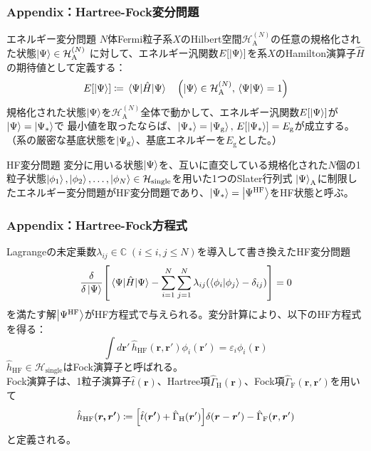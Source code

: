 \documentclass[14pt,aspectratio=169,xcolor=dvipsnames,table,dvipdfmx]{beamer}
\theoremstyle{definition}
\begin{document}
\begin{frame}
  \small
  \frametitle{Appendix：Hartree-Fock変分問題}
  \begin{block}{エネルギー変分問題}
    $N$体Fermi粒子系$X$のHilbert空間$\mathcal{H}_{\text{A}}^{(N)}$の任意の規格化された状態$\ket{\Psi}\in\mathcal{H}_{\text{A}}^{(N)}$
    に対して、エネルギー汎関数$E[\ket{\Psi}]$を系$X$のHamilton演算子$\hat{H}$の期待値として定義する：
    \begin{equation*}
      E[\ket{\Psi}]\coloneqq \ev{\hat{H}}{\Psi}\quad\qty(\ket{\Psi}\in\mathcal{H}_{\text{A}}^{(N)},\,\braket{\Psi}=1)
    \end{equation*}
    規格化された状態$\ket{\Psi}$を$\mathcal{H}_{\text{A}}^{(N)}$全体で動かして、エネルギー汎関数$E[\ket{\Psi}]$が$\ket{\Psi}=\ket{\Psi_*}$で
    最小値を取ったならば、$\ket{\Psi_*}=\ket{\Psi_{\text{g}}},\,E[\ket{\Psi_*}]=E_{\text{g}}$が成立する。\\
    （系の厳密な基底状態を$\ket{\Psi_{\text{g}}}$、基底エネルギーを$E_{\text{g}}$とした。）
  \end{block}
  \begin{exampleblock}{HF変分問題}
    変分に用いる状態$\ket{\Psi}$を、互いに直交している規格化された$N$個の1粒子状態$\ket{\phi_1},\ket{\phi_2},\ldots,\ket{\phi_{N}}\in\mathcal{H}_{\text{single}}$を用いた1つのSlater行列式
    $\ket{\Psi}_{\text{A}}$に制限したエネルギー変分問題がHF変分問題であり、$\ket{\Psi_*}=\ket{\Psi^{\text{HF}}}$をHF状態と呼ぶ。
  \end{exampleblock}
\end{frame}

\begin{frame}
  \frametitle{Appendix：Hartree-Fock方程式}
  \small
  Lagrangeの未定乗数$\lambda_{ij}\in\mathbb{C}\;(i\leq i,j\leq N)$を導入して書き換えたHF変分問題
  \begin{equation*}
    \fdv{\ket{\Psi}}\qty[\ev{\hat{H}}{\Psi}-\sum_{i=1}^N\sum_{j=1}^{N}\lambda_{ij}(\braket{\phi_i}{\phi_j}-\delta_{ij})]=0
  \end{equation*}
  を満たす解$\ket{\Psi^{\text{HF}}}$がHF方程式で与えられる。変分計算により、以下のHF方程式を得る：
  \begin{equation*}
    \int d\bm{r}'\,\hat{h}_{\text{HF}}(\bm{r},\bm{r}')\phi_i(\bm{r}')  = \varepsilon_i\phi_i(\bm{r})
  \end{equation*}
  $\hat{h}_{\text{HF}}\in\mathcal{H}_{\text{single}}$はFock演算子と呼ばれる。\\
  Fock演算子は、1粒子演算子$\hat{t}(\bm{r})$、Hartree項$\hat{\Gamma}_{\text{H}}(\bm{r})$、Fock項$\hat{\Gamma}_{\text{F}}(\bm{r},\bm{r}')$を用いて
  \begin{equation*}
    \hat{h}_{\text{HF}}(\bm{r,\bm{r}'})\coloneqq \qty[\hat{t}(\bm{r'})+\hat{\Gamma}_{\text{H}}(\bm{r}')]\delta(\bm{r}-\bm{r}')-\hat{\Gamma}_{\text{F}}(\bm{r},\bm{r}')
  \end{equation*}
  と定義される。
\end{frame}
\end{document}
